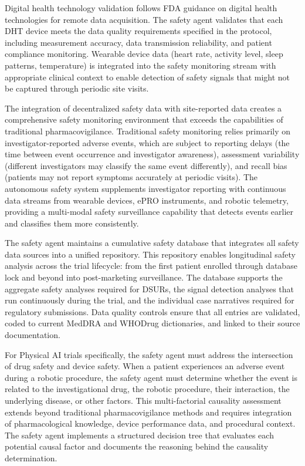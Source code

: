 Digital health technology validation follows FDA guidance on digital health technologies for
remote data acquisition. The safety agent validates that each DHT device meets the data
quality requirements specified in the protocol, including measurement accuracy, data
transmission reliability, and patient compliance monitoring. Wearable device data (heart
rate, activity level, sleep patterns, temperature) is integrated into the safety monitoring
stream with appropriate clinical context to enable detection of safety signals that might
not be captured through periodic site visits.

The integration of decentralized safety data with site-reported data creates a comprehensive
safety monitoring environment that exceeds the capabilities of traditional pharmacovigilance.
Traditional safety monitoring relies primarily on investigator-reported adverse events, which
are subject to reporting delays (the time between event occurrence and investigator awareness),
assessment variability (different investigators may classify the same event differently), and
recall bias (patients may not report symptoms accurately at periodic visits). The autonomous
safety system supplements investigator reporting with continuous data streams from wearable
devices, ePRO instruments, and robotic telemetry, providing a multi-modal safety surveillance
capability that detects events earlier and classifies them more consistently.

The safety agent maintains a cumulative safety database that integrates all safety data
sources into a unified repository. This repository enables longitudinal safety analysis across
the trial lifecycle: from the first patient enrolled through database lock and beyond into
post-marketing surveillance. The database supports the aggregate safety analyses required for
DSURs, the signal detection analyses that run continuously during the trial, and the
individual case narratives required for regulatory submissions. Data quality controls ensure
that all entries are validated, coded to current MedDRA and WHODrug dictionaries, and linked
to their source documentation.

For Physical AI trials specifically, the safety agent must address the intersection of drug
safety and device safety. When a patient experiences an adverse event during a robotic
procedure, the safety agent must determine whether the event is related to the investigational
drug, the robotic procedure, their interaction, the underlying disease, or other factors. This
multi-factorial causality assessment extends beyond traditional pharmacovigilance methods and
requires integration of pharmacological knowledge, device performance data, and procedural
context. The safety agent implements a structured decision tree that evaluates each potential
causal factor and documents the reasoning behind the causality determination.

